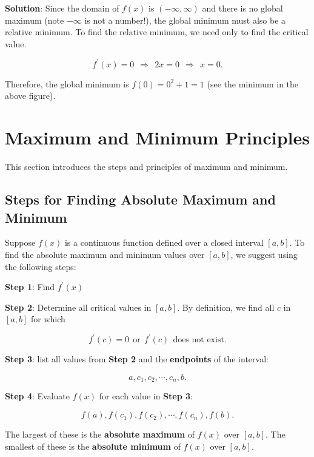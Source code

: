 \documentclass[
]{book}
\begin{document}
\textbf{Solution}: Since the domain of \(f(x)\) is \((-\infty, \infty)\) and there is no global maximum (note \(-\infty\) is not a number!), the global minimum must also be a relative minimum. To find the relative minimum, we need only to find the critical value.

\[
f^\prime(x) = 0 ~~\Rightarrow~~  2x = 0 ~~ \Rightarrow ~~  x = 0.
\]

Therefore, the global minimum is \(f(0) = 0^2 + 1 = 1\) (see the minimum in the above figure).

\hfill\break

\hypertarget{maximum-and-minimum-principles}{%
\section{Maximum and Minimum Principles}\label{maximum-and-minimum-principles}}

This section introduces the steps and principles of maximum and minimum.

\hypertarget{steps-for-finding-absolute-maximum-and-minimum}{%
\subsection{Steps for Finding Absolute Maximum and Minimum}\label{steps-for-finding-absolute-maximum-and-minimum}}

Suppose \(f(x)\) is a continuous function defined over a closed interval \([a, b]\). To find the absolute maximum and minimum values over \([a, b]\), we suggest using the following steps:

\textbf{Step 1}: Find \(f^\prime(x)\)

\textbf{Step 2}: Determine all critical values in \([a, b]\). By definition, we find all \(c\) in \([a, b]\) for which

\[
f^\prime(c) = 0 ~~\text{or}~~ f^\prime(c)~~\text{does not exist}.
\]

\textbf{Step 3}: list all values from \textbf{Step 2} and the \textbf{endpoints} of the interval:

\[
a, c_1, c_2, \cdots, c_n, b.
\]

\textbf{Step 4}: Evaluate \(f(x)\) for each value in \textbf{Step 3}:

\[
f(a), f(c_1), f(c_2), \cdots, f(c_n), f(b).
\]

The largest of these is the \textbf{absolute maximum} of \(f(x)\) over \([a, b]\). The smallest of these is the \textbf{absolute minimum} of \(f(x)\) over \([a, b]\).
\end{document}
